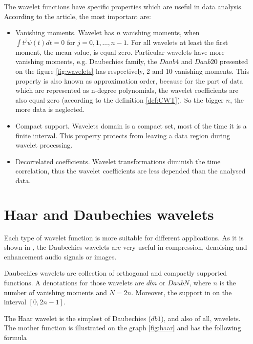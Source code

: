 The wavelet functions have specific properties which are useful in data analysis. According to the \cite{WaveletMethodsInDataMining} article, the most important are:

\begin{itemize}
\item Vanishing moments. Wavelet has $n$ vanishing moments, when $\int t^j \psi(t) dt=0$ for $j=0,1,\ldots,n-1$. For all wavelets at least the first moment, the mean value, is equal zero. Particular wavelets have more vanishing moments, e.g. Daubechies family, the $Daub4$ and $Daub20$ presented on the figure \ref{fig:wavelets} has respectively, 2 and 10 vanishing moments. This property is also known as approximation order, because for the part of data which are represented as n-degree polynomials, the wavelet coefficients are also equal zero (according to the definition \ref{def:CWT}). So the bigger $n$, the more data is neglected.

\item Compact support. Wavelets domain is a compact set, most of the time it is a finite interval. This property protects from leaving a data region during wavelet processing.

\item Decorrelated coefficients. Wavelet transformations diminish the time correlation, thus the wavelet coefficients are less depended than the analysed data.
\end{itemize}


\section{Haar and Daubechies wavelets}

Each type of wavelet function is more suitable for different applications. As it is shown in \cite{APrimerOnWavelets}, the Daubechies wavelets are very useful in compression, denoising and enhancement audio signals or images.

\begin{defn}
Daubechies wavelets are collection of orthogonal and compactly supported functions. A denotations for those wavelets are $dbn$ or $DaubN$, where $n$ is the number of vanishing moments and $N=2n$. Moreover, the support in on the interval $[0, 2n-1]$.
\end{defn}

The Haar wavelet is the simplest of Daubechies ($db1$), and also of all, wavelets. The mother function is illustrated on the graph \ref{fig:haar} and has the following formula

